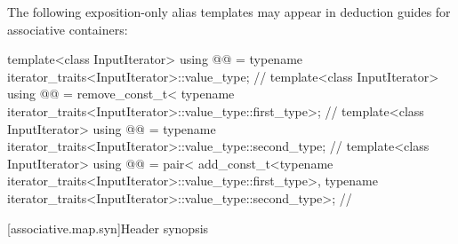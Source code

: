\pnum
The following exposition-only alias templates may appear in deduction guides for associative containers:
\begin{codeblock}
template<class InputIterator>
  using @@ =
    typename iterator_traits<InputIterator>::value_type;                // \expos
template<class InputIterator>
  using @@ = remove_const_t<
    typename iterator_traits<InputIterator>::value_type::first_type>;   // \expos
template<class InputIterator>
  using @@ =
    typename iterator_traits<InputIterator>::value_type::second_type;   // \expos
template<class InputIterator>
  using @@ = pair<
    add_const_t<typename iterator_traits<InputIterator>::value_type::first_type>,
    typename iterator_traits<InputIterator>::value_type::second_type>;  // \expos
\end{codeblock}

[associative.map.syn]{Header  synopsis}


